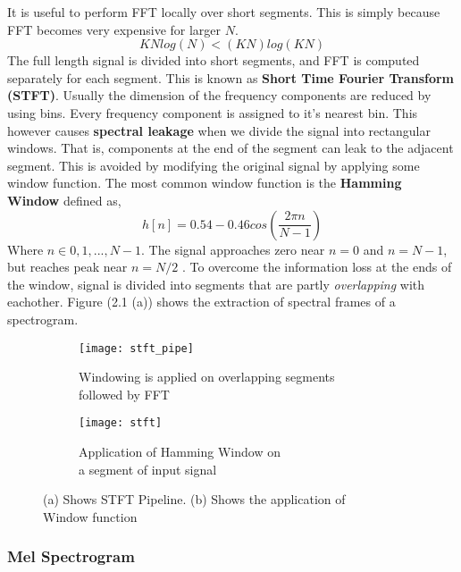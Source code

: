 It is useful to perform FFT locally over short segments. This is simply because FFT becomes very expensive for larger $N$. 
\[
KNlog(N) < (KN)log(KN)
\]
The full length signal is divided into short segments, and FFT is computed separately for each segment. This is known as \textbf{Short Time Fourier Transform (STFT)}. Usually the dimension of the frequency components are reduced by using bins. Every frequency component is assigned to it's nearest bin. This however causes \textbf{spectral leakage} when we divide the signal into rectangular windows. That is, components at the end of the segment can leak to the adjacent segment. This is avoided by modifying the original signal by applying some window function. The most common window function is the \textbf{Hamming Window} defined as,
\begin{equation}
h[n] = 0.54 - 0.46cos(\frac{2 \pi n}{N-1})
\end{equation}
Where $n \in {0,1,...,N-1}$. The signal approaches zero near $n=0$ and $n=N-1$, but reaches peak near $n=N/2$ \cite{specLeak}. To overcome the information loss at the ends of the window, signal is divided into segments that are partly \textit{overlapping} with eachother. Figure (2.1 (a)) shows the extraction of spectral frames of a spectrogram.  
\begin{figure}[h]
       \begin{subfigure}[b]{0.6\textwidth}
        \texttt{[image: stft\_pipe]}
        \caption{Windowing is applied on overlapping segments\\ followed by FFT }
        \label{fig:STFT Pipe}
       \end{subfigure}
	    \begin{subfigure}[b]{0.4\textwidth}
        \texttt{[image: stft]}
        \caption{
        Application of Hamming Window on \\a segment of input signal
        }
        \label{fig:Hamming Window}
       \end{subfigure}
       \caption{(a) Shows STFT Pipeline. (b) Shows the application of \\Window function}\label{fig:STFT}
\end{figure}
\bigskip

\subsubsection{Mel Spectrogram}



